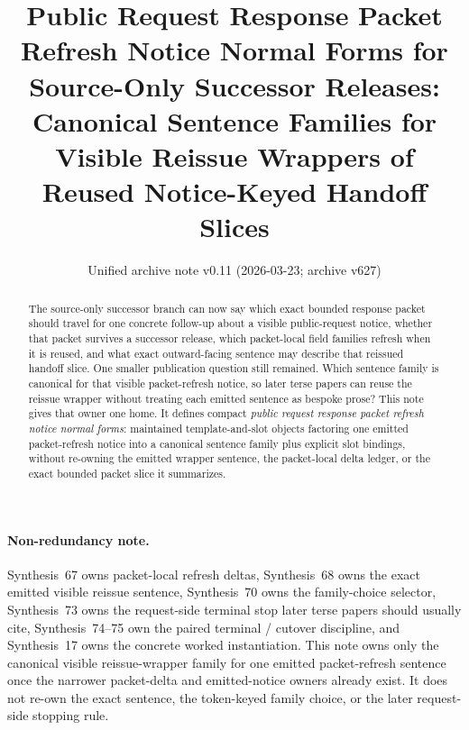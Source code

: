 \documentclass[11pt]{article}
\title{Public Request Response Packet Refresh Notice Normal Forms for Source-Only Successor Releases:\\[0.5ex]
\large Canonical Sentence Families for Visible Reissue Wrappers of Reused Notice-Keyed Handoff Slices}
\author{}
\date{Unified archive note v0.11 (2026-03-23; archive v627)}
\begin{document}
\maketitle

\begin{abstract}
The source-only successor branch can now say which exact bounded response packet should travel for one concrete follow-up about a visible public-request notice, whether that packet survives a successor release, which packet-local field families refresh when it is reused, and what exact outward-facing sentence may describe that reissued handoff slice. One smaller publication question still remained. Which sentence family is canonical for that visible packet-refresh notice, so later terse papers can reuse the reissue wrapper without treating each emitted sentence as bespoke prose? This note gives that owner one home. It defines compact \emph{public request response packet refresh notice normal forms}: maintained template-and-slot objects factoring one emitted packet-refresh notice into a canonical sentence family plus explicit slot bindings, without re-owning the emitted wrapper sentence, the packet-local delta ledger, or the exact bounded packet slice it summarizes.
\end{abstract}

\paragraph{Non-redundancy note.}
Synthesis~67 owns packet-local refresh deltas, Synthesis~68 owns the exact emitted visible reissue sentence, Synthesis~70 owns the family-choice selector, Synthesis~73 owns the request-side terminal stop later terse papers should usually cite, Synthesis~74--75 own the paired terminal / cutover discipline, and Synthesis~17 owns the concrete worked instantiation.\cite{series:publicrequestresponsepacketdeltas,series:publicrequestresponsepacketrefreshnotices,series:publicrequestresponsepacketrefreshnoticeselections,series:publicrequestresponsepacketrefreshresponsepacketclosureverdicts,series:pairedterminalcitationdiscipline,series:pairedterminalcutoverrule,series:workedexample}
This note owns only the canonical visible reissue-wrapper family for one emitted packet-refresh sentence once the narrower packet-delta and emitted-notice owners already exist. It does not re-own the exact sentence, the token-keyed family choice, or the later request-side stopping rule.
\end{document}
